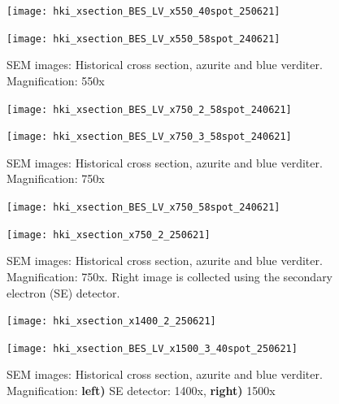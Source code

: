 \begin{figure}[H]
\centering
\begin{minipage}{.45\textwidth}
  \centering
  \texttt{[image: hki\_xsection\_BES\_LV\_x550\_40spot\_250621]}
\end{minipage}
\begin{minipage}{.45\textwidth}
  \centering
  \texttt{[image: hki\_xsection\_BES\_LV\_x550\_58spot\_240621]}
\end{minipage}
\caption[SEM images: Historical cross section, azurite and blue verditer]{SEM images: Historical cross section, azurite and blue verditer. Magnification: 550x}
\label{fig:xsection_jeol_1}
\end{figure}

\begin{figure}[H]
\centering
\begin{minipage}{.45\textwidth}
  \centering
  \texttt{[image: hki\_xsection\_BES\_LV\_x750\_2\_58spot\_240621]}
\end{minipage}
\begin{minipage}{.45\textwidth}
  \centering
  \texttt{[image: hki\_xsection\_BES\_LV\_x750\_3\_58spot\_240621]}
\end{minipage}
\caption[SEM images: Historical cross section, azurite and blue verditer]{SEM images: Historical cross section, azurite and blue verditer. Magnification: 750x}
\label{fig:xsection_jeol_2}
\end{figure}

\begin{figure}[H]
\centering
\begin{minipage}{.45\textwidth}
  \centering
  \texttt{[image: hki\_xsection\_BES\_LV\_x750\_58spot\_240621]}
\end{minipage}
\begin{minipage}{.45\textwidth}
  \centering
  \texttt{[image: hki\_xsection\_x750\_2\_250621]}
\end{minipage}
\caption[SEM images: Historical cross section, azurite and blue verditer]{SEM images: Historical cross section, azurite and blue verditer. Magnification: 750x. Right image is collected using the secondary electron (SE) detector.}
\label{fig:xsection_jeol_3}
\end{figure}

\begin{figure}[H]
\centering
\begin{minipage}{.45\textwidth}
  \centering
  \texttt{[image: hki\_xsection\_x1400\_2\_250621]}
\end{minipage}
\begin{minipage}{.45\textwidth}
  \centering
  \texttt{[image: hki\_xsection\_BES\_LV\_x1500\_3\_40spot\_250621]}
\end{minipage}
\caption[SEM images: Historical cross section, azurite and blue verditer]{SEM images: Historical cross section, azurite and blue verditer. Magnification: \textbf{left)} SE detector: 1400x, \textbf{right)} 1500x}
\label{fig:xsection_jeol_4}
\end{figure}

